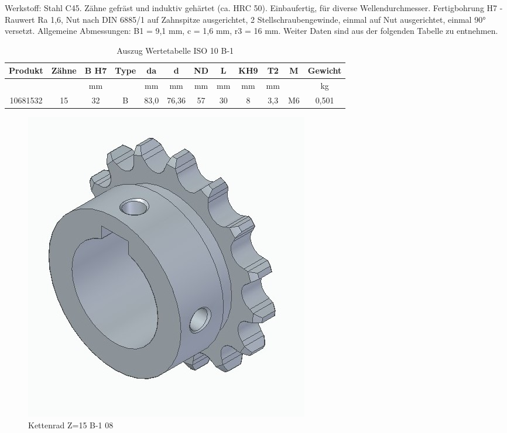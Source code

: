 Werkstoff: Stahl C45. Zähne gefräst und induktiv gehärtet (ca. HRC 50). Einbaufertig, für diverse Wellendurchmesser. Fertigbohrung H7 -Rauwert Ra 1,6, Nut nach DIN 6885/1 auf Zahnspitze ausgerichtet, 2 Stellschraubengewinde, einmal auf Nut ausgerichtet, einmal 90° versetzt. Allgemeine Abmessungen: B1 = 9,1 mm, c = 1,6 mm, r3 = 16 mm. 
Weiter Daten sind aus der folgenden Tabelle zu entnehmen.

\begin{table}[H]
\begin{tabular}{|c|c|c|c|c|c|c|c|c|c|c|c|}
\hline
\textbf{Produkt} & \textbf{Zähne} & \textbf{B H7} & \textbf{Type} & \textbf{da} & \textbf{d} & \textbf{ND} & \textbf{L} & \textbf{KH9} & \textbf{T2} & \textbf{M} & \textbf{Gewicht} \\ \hline
                 & \textbf{}                 & mm                           &               & mm          & mm         & mm          & mm         & mm           & mm          &            & kg               \\ \hline
10681532         & 15                        & 32                           & B             & 83,0        & 76,36      & 57          & 30         & 8            & 3,3         & M6         & 0,501            \\ \hline
\end{tabular}
\caption{Auszug Wertetabelle ISO 10 B-1}
\end{table}

\newpage

\begin{figure} [H]
	\begin{center}
		\includegraphics[scale=0.3]{figures/mechanik/10581532.jpg}
			\caption{Kettenrad Z=15 B-1 08}
			\label{fig:Kettenrad Z=15 B-1 08}
	\end{center}
\end{figure}


